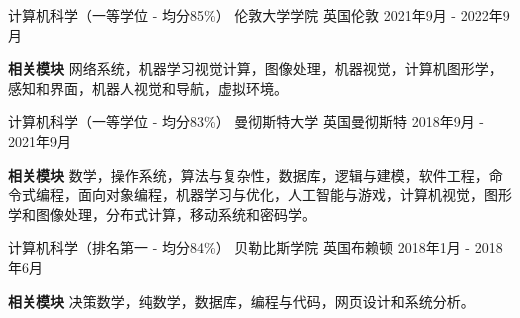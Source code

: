 
\begin{cventries}

\eduentry
{计算机科学（一等学位 - 均分85\%）} %
{伦敦大学学院} %
{英国伦敦} %
{2021年9月 - 2022年9月} %
{
\begin{cvitems} %
\item {\textbf{相关模块} 网络系统，机器学习视觉计算，图像处理，机器视觉，计算机图形学，感知和界面，机器人视觉和导航，虚拟环境。}
\end{cvitems}
}

\eduentry
{计算机科学（一等学位 - 均分83\%）} %
{曼彻斯特大学} %
{英国曼彻斯特} %
{2018年9月 - 2021年9月} %
{
\begin{cvitems} %
\item {\textbf{相关模块} 数学，操作系统，算法与复杂性，数据库，逻辑与建模，软件工程，命令式编程，面向对象编程，机器学习与优化，人工智能与游戏，计算机视觉，图形学和图像处理，分布式计算，移动系统和密码学。}
\end{cvitems}
}

\eduentry
{计算机科学（排名第一 - 均分84\%）} %
{贝勒比斯学院} %
{英国布赖顿} %
{2018年1月 - 2018年6月} %
{
\begin{cvitems} %
\item {\textbf{相关模块} 决策数学，纯数学，数据库，编程与代码，网页设计和系统分析。}
\end{cvitems}
}
\end{cventries}